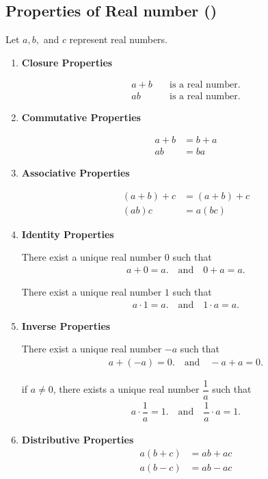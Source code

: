 \documentclass{rmutt-seminar}
\begin{document}
\subsection{Properties of Real number (\cite{MIDC14})}
Let $a, b,$ and $c$ represent real numbers.
\begin{enumerate}
\item \textbf{Closure Properties}

\begin{align*}
a+b \quad &\text{is a real number.}\\
ab \quad &\text{is a real number.}
\end{align*}

\item \textbf{Commutative Properties}

\begin{align*}
a+b &= b+ a\\
	ab &= ba
\end{align*}

\item \textbf{Associative Properties}

\begin{align*}
	( a + b ) + c &= ( a + b ) + c \\
	(ab)c &= a(bc)
\end{align*}

\item \textbf{Identity Properties}

There exist a unique real number $0$ such that
\begin{align*}
	 a + 0 = a. \quad \text{and} \quad 0 + a = a.
\end{align*}

There exist a unique real number $1$ such that
\begin{align*}
	 a \cdot 1 = a. \quad \text{and} \quad 1 \cdot a = a.
\end{align*}

\item \textbf{Inverse Properties}

There exist a unique real number $-a$ such that
\begin{align*}
	 a + (-a) = 0. \quad \text{and} \quad -a + a = 0.
\end{align*}

if $a \neq 0$, there exists a  unique real number $\dfrac{1}{a}$ such that
\begin{align*}
	 a \cdot \dfrac{1}{a} = 1. \quad \text{and} \quad \dfrac{1}{a} \cdot a = 1.
\end{align*}

\item \textbf{Distributive Properties}
\begin{align*}
	a(b+c) &= ab + ac\\
	a(b-c) &= ab - ac
\end{align*}
\end{enumerate}
\end{document}
